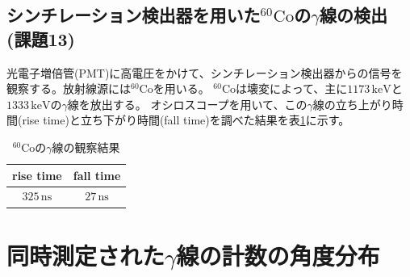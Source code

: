 \documentclass[11pt, titlepage, openany]{ltjsbook}
\begin{document}
\section{シンチレーション検出器を用いた$^{60}\mathrm{Co}$の$\gamma$線の検出 (課題13)}
光電子増倍管(PMT)に高電圧をかけて、シンチレーション検出器からの信号を観察する。放射線源には$^{60}\mathrm{Co}$を用いる。
$^{60}\mathrm{Co}$は壊変によって、主に$1173\,\mathrm{keV}$と$1333\,\mathrm{keV}$の$\gamma$線を放出する。
オシロスコープを用いて、この$\gamma$線の立ち上がり時間(rise time)と立ち下がり時間(fall time)を調べた結果を表\ref{Co}に示す。
\begin{table}[H]
    \centering
    \begin{tabular}{c|c}
        rise time & fall time \\ \hline
        $325\,\mathrm{ns}$ & $27\,\mathrm{ns}$
    \end{tabular}
    \caption{$^{60}\mathrm{Co}$の$\gamma$線の観察結果}
    \label{Co}
\end{table}

\chapter{同時測定された$\gamma$線の計数の角度分布}
\label{appB}
\end{document}
